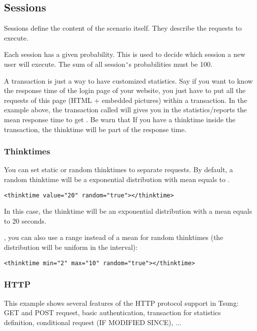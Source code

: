 \documentclass{TSUNG-en}
\begin{document}
\subsection{Sessions}
\label{sec:sessions}

Sessions define the content of the scenario itself. They describe
the requests to execute.


Each session has a given probability. This is used to decide which
session a new user will execute. The sum of all session\verb|'|s
probabilities must be 100.



A transaction is just a way to have customized statistics. Say if you
want to know the response time of the login page of your website, you
just have to put all the requests of this page (HTML + embedded
pictures) within a transaction. In the example above, the transaction
called  will gives you in the
statistics/reports the mean response time to get
. Be warn that If you have a
thinktime inside the transaction, the thinktime will be part of the
response time.

\subsubsection{Thinktimes}

You can set static or random thinktimes to separate requests. By
default, a random thinktime will be a exponential distribution with
mean equals to .

\begin{Verbatim}
<thinktime value="20" random="true"></thinktime>
\end{Verbatim}

In this case, the thinktime will be an exponential distribution with a
mean equals to 20 seconds.

, you can also use a range
 instead of a mean for random thinktimes (the
distribution will be uniform in the interval):
\begin{Verbatim}
<thinktime min="2" max="10" random="true"></thinktime>
\end{Verbatim}


\subsubsection{HTTP}


This example shows several features of the HTTP protocol support in
Tsung: GET and POST request, basic authentication, transaction for
statistics definition, conditional request (IF MODIFIED SINCE), ...
\end{document}
